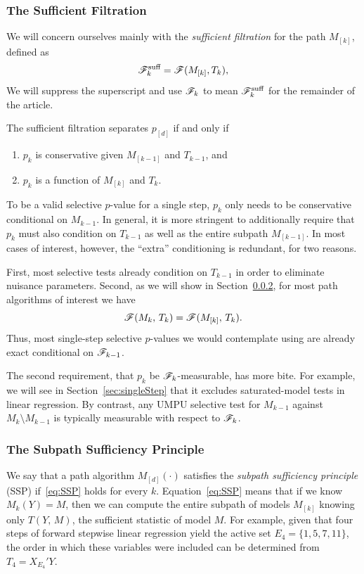 \documentclass{article}
\begin{document}
\subsubsection{The Sufficient Filtration}\label{sec:suffFilt}

We will concern ourselves mainly with the {\em sufficient filtration} for the path $M_{[k]}$, defined as
\[
\mathscr{F}_k^{\text{suff}} = \mathscr{F}(M_{[k]}, T_k),
\]
We will suppress the superscript and use $\mathscr{F}_k$ to mean $\mathscr{F}_k^{\text{suff}}$ for the remainder of the article. 

The sufficient filtration separates $p_{[d]}$ if and only if 
\begin{enumerate}
\item $p_k$ is conservative given $M_{[k-1]}$ and $T_{k-1}$, and
\item $p_k$ is a function of $M_{[k]}$ and $T_k$.
\end{enumerate}

To be a valid selective $p$-value for a single step, $p_k$ only needs to be conservative conditional on $M_{k-1}$. In general, it is more stringent to additionally require that $p_k$ must also condition on $T_{k-1}$ as well as the entire subpath $M_{[k-1]}$. In most cases of interest, however, the ``extra'' conditioning is redundant, for two reasons. 

First, most selective tests already condition on $T_{k-1}$ in order to eliminate nuisance parameters. Second, as we will show in Section~\ref{sec:SSP}, for most path algorithms of interest we have
\begin{equation}\label{eq:SSP}
\mathscr{F}(M_k, \, T_k) = \mathscr{F}(M_{[k]}, \, T_k).
\end{equation}
Thus, most single-step selective $p$-values we would contemplate using are already exact conditional on $\mathscr{F}_{k-1}$.

The second requirement, that $p_k$ be $\mathscr{F}_k$-measurable, has more bite. For example, we will see in Section~\ref{sec:singleStep} that it excludes saturated-model tests in linear regression. By contrast, any UMPU selective test for $M_{k-1}$ against $M_k\setminus M_{k-1}$ is typically measurable with respect to $\mathscr{F}_k$.


\subsubsection{The Subpath Sufficiency Principle}\label{sec:SSP}


We say that a path algorithm $M_{[d]}(\cdot)$ satisfies the {\em subpath sufficiency principle} (SSP) if~\eqref{eq:SSP} holds for every $k$. Equation~\eqref{eq:SSP} means that if we know $M_k(Y) = M$, then we can compute the entire subpath of models $M_{[k]}$ knowing only $T(Y, \, M)$, the sufficient statistic of model $M$. For example, given that four steps of forward stepwise linear regression yield the active set $E_4 = \{1,5,7,11\}$, the order in which these variables were included can be determined from $T_4 = X_{E_4}'Y$.
\end{document}
